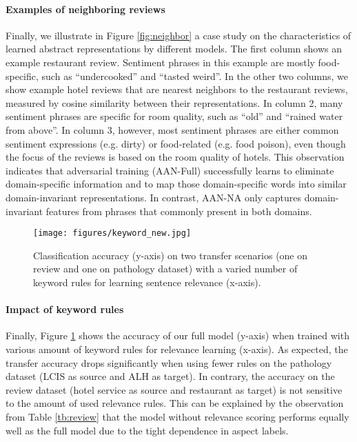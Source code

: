 
\paragraph{Examples of neighboring reviews} Finally, we illustrate in Figure \ref{fig:neighbor} a case study on the characteristics of learned abstract representations by different models. The first column shows an example restaurant review. Sentiment phrases in this example are mostly food-specific, such as ``undercooked'' and ``tasted weird''. In the other two columns, we show example hotel reviews that are nearest neighbors to the restaurant reviews, measured by cosine similarity between their representations. In column 2, many sentiment phrases are specific for room quality, such as ``old'' and ``rained water from above''. In column 3, however, most sentiment phrases are either common sentiment expressions (e.g. dirty) or food-related (e.g. food poison), even though the focus of the reviews is based on the room quality of hotels. This observation indicates that adversarial training (AAN-Full) successfully learns to eliminate domain-specific information and to map those domain-specific words into similar domain-invariant representations. In contrast, AAN-NA only captures domain-invariant features from phrases that commonly present in both domains.

\begin{figure}[t]
\centering
\texttt{[image: figures/keyword\_new.jpg]}
\caption{Classification accuracy (y-axis) on two transfer scenarios (one on review and one on pathology dataset) with a varied number of  keyword rules for learning sentence relevance (x-axis).
}\label{fig:keyword}
\end{figure}

\paragraph{Impact of keyword rules} Finally, Figure \ref{fig:keyword} shows the accuracy of our full model (y-axis) when trained with various amount of keyword rules for relevance learning (x-axis). As expected, the transfer accuracy drops significantly when using fewer rules on the pathology dataset (LCIS as source and ALH as target). In contrary, the accuracy on the review dataset (hotel service as source and restaurant as target) is not sensitive to the amount of used relevance rules. This can be explained by the observation from Table \ref{tb:review} that the model without relevance scoring performs equally well as the full model due to the tight dependence in aspect labels. 


